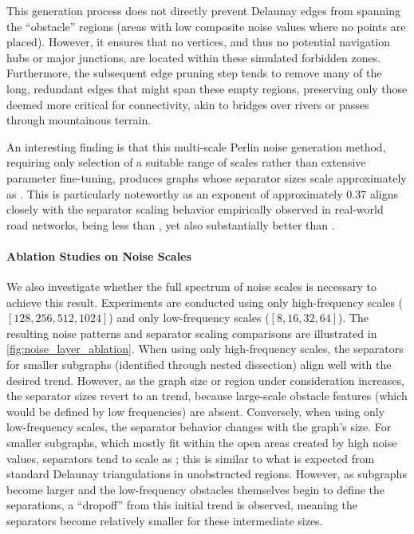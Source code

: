 This generation process does not directly prevent Delaunay edges from spanning the \enquote{obstacle} regions (areas with low composite noise values where no points are placed).
However, it ensures that no vertices, and thus no potential navigation hubs or major junctions, are located within these simulated forbidden zones.
Furthermore, the subsequent edge pruning step tends to remove many of the long, redundant edges that might span these empty regions, preserving only those deemed more critical for connectivity, akin to bridges over rivers or passes through mountainous terrain.

An interesting finding is that this multi-scale Perlin noise generation method, requiring only selection of a suitable range of scales rather than extensive parameter fine-tuning, produces graphs whose separator sizes scale approximately as .
This is particularly noteworthy as an exponent of approximately \(0.37\) aligns closely with the separator scaling behavior empirically observed in real-world road networks, being less than , yet also substantially better than .


\paragraph{Ablation Studies on Noise Scales}

We also investigate whether the full spectrum of noise scales is necessary to achieve this result.
Experiments are conducted using only high-frequency scales (\([128, 256, 512, 1024]\)) and only low-frequency scales (\([8, 16, 32, 64]\)).
The resulting noise patterns and separator scaling comparisons are illustrated in \cref{fig:noise_layer_ablation}.
When using only high-frequency scales, the separators for smaller subgraphs (identified through nested dissection) align well with the desired trend. However, as the graph size or region under consideration increases, the separator sizes revert to an  trend, because large-scale obstacle features (which would be defined by low frequencies) are absent.
Conversely, when using only low-frequency scales, the separator behavior changes with the graph's size.
For smaller subgraphs, which mostly fit within the open areas created by high noise values, separators tend to scale as ; this is similar to what is expected from standard Delaunay triangulations in unobstructed regions.
However, as subgraphs become larger and the low-frequency obstacles themselves begin to define the separations, a \enquote{dropoff} from this initial  trend is observed, meaning the separators become relatively smaller for these intermediate sizes.

